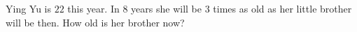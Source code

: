 Ying Yu is $22$ this year. In $8$ years she will be $3$ times as old as her little brother will be then. How old is her brother now?
